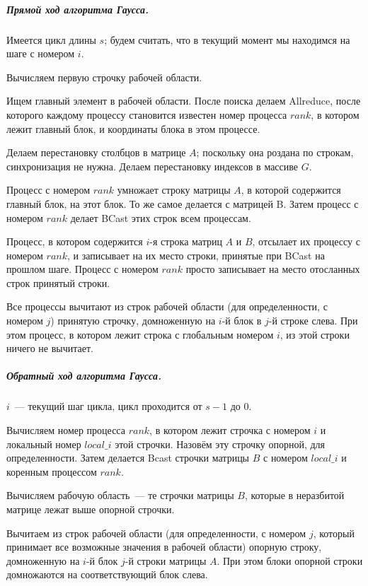 \documentclass[12pt]{article}
\begin{document}
\subparagraph{Прямой ход алгоритма Гаусса.}
Имеется цикл длины $s$; будем считать, что в текущий момент мы находимся на шаге с номером $i$.
\begin{enumerate}
  \begin{item}
    Вычисляем первую строчку рабочей области.
  \end{item}
  \begin{item}
    Ищем главный элемент в рабочей области. После поиска делаем Allreduce, после которого каждому процессу становится известен номер процесса $rank$, в котором лежит главный блок, и координаты блока в этом процессе.
  \end{item}
  \begin{item}
    Делаем перестановку столбцов в матрице $A$; поскольку она роздана по строкам, синхронизация не нужна. Делаем перестановку индексов в массиве $G$.
  \end{item}
  \begin{item}
    Процесс с номером $rank$ умножает строку матрицы $A$, в которой содержится главный блок, на этот блок. То же самое делается с матрицей B. Затем процесс с номером $rank$ делает BCast этих строк всем процессам.
  \end{item}
  \begin{item}
    Процесс, в котором содержится $i$-я строка матриц $A$ и $B$, отсылает их процессу с номером $rank$, и записывает на их место строки, принятые при BCast на прошлом шаге.
    Процесс с номером $rank$ просто записывает на место отосланных строк принятый строки.
  \end{item}
  \begin{item}
    Все процессы вычитают из строк рабочей области (для определенности, с номером $j$) принятую строчку, домноженную на $i$-й блок в $j$-й строке слева. При этом процесс, в котором лежит строка с глобальным номером $i$, из этой строки ничего не вычитает.
  \end{item}

\end{enumerate}

\subparagraph{Обратный ход алгоритма Гаусса.}
$i$~--- текущий шаг цикла, цикл проходится от $s-1$ до $0$.
\begin{enumerate}
\begin{item}
  Вычисляем номер процесса $rank$, в котором лежит строчка с номером $i$ и локальный номер $local\_i$ этой строчки. Назовём эту строчку опорной, для определенности. Затем делается Bcast строчки матрицы $B$ с номером $local\_i$ и коренным процессом $rank$.
\end{item}
\begin{item}
  Вычисляем рабочую область~--- те строчки матрицы $B$, которые в неразбитой матрице лежат выше опорной строчки.
\end{item}
\begin{item}
  Вычитаем из строк рабочей области (для определенности, с номером $j$, который принимает все возможные значения в рабочей области) опорную строку, домноженную на $i$-й блок $j$-й строки матрицы $A$. При этом блоки опорной строки домножаются на соответствующий блок слева.
\end{item}
\end{enumerate}
\end{document}
